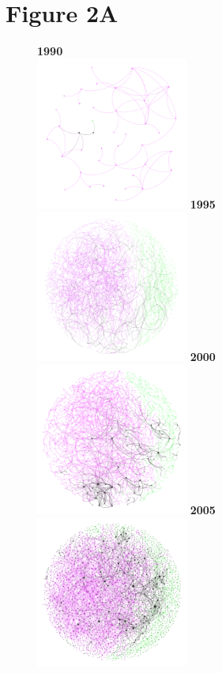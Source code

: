 \documentclass[10pt]{article}         %
\begin{document}
\section{Figure 2A}
\begin{figure}[!htb]
    \textbf{1990}\\
    \includegraphics[width=5cm, height=5cm]{Fig2A1990.png}
  \endminipage\hfill
    \textbf{1995}\\
    \includegraphics[width=5cm, height=5cm]{Fig2A1995.png}
  \endminipage\hfill
    \textbf{2000}\\
    \includegraphics[width=5cm, height=5cm]{Fig2A2000.png}
  \endminipage\hfill
    \textbf{2005}\\
    \includegraphics[width=5cm, height=5cm]{Fig2A2005.png}

\end{figure}
\end{document}
